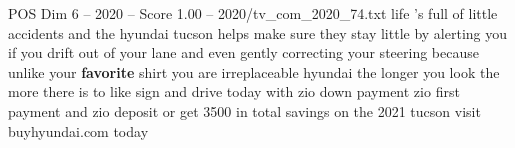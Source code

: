\begin{textsample}{POS Dim 6 – 2020 – Score 1.00 – 2020/tv\_com\_2020\_74.txt}  \label{ex:f6_pos_049}
life 's full of little accidents and the hyundai tucson helps make sure they stay little by alerting you if you drift out of your lane and even gently correcting your steering because unlike your \textbf{favorite} shirt you are irreplaceable hyundai the longer you look the more there is to like sign and drive today with zio down payment zio first payment and zio deposit or get 3500 in total savings on the 2021 tucson visit buyhyundai.com today

\end{textsample}
